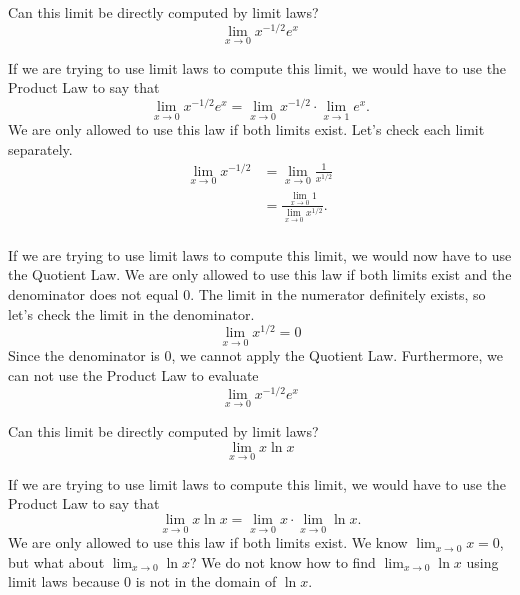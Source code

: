 \documentclass{ximera}
\begin{document}
\begin{question}
  Can this limit be directly computed by limit laws?
  \[
  \lim_{x\to 0}{x^{-1/2}e^x}
  \]
  \begin{prompt}
  \begin{multipleChoice}
  \end{multipleChoice}
  \begin{feedback}
    If we are trying to use limit laws to compute this limit, we would have to use the Product Law to say that
    \[
    \lim_{x\to 0}{x^{-1/2}e^x}= \lim_{x\to 0}{x^{-1/2}\cdot \lim_{x\to 1}e^x}.
    \]
    We are only allowed to use this law if both limits exist.  Let's
    check each limit separately.
    \begin{align*}
      \lim_{x\to 0} x^{-1/2} &= \lim_{x\to 0} \frac{1}{x^{1/2}}\\
      &= \frac{\lim_{x\to 0}1}{\lim_{x\to 0}x^{1/2}}.\\
    \end{align*}

   If we are trying to use limit laws to compute this limit, we would now have to use the Quotient Law. We are only allowed to use this law if both limits exist and the denominator does not equal $0$.  The limit in the numerator definitely exists, so let's check the limit in the denominator.
   $$
   \lim_{x\to 0}x^{1/2} = 0
   $$
  Since the denominator is $0$, we cannot apply the Quotient Law. Furthermore, we can not use the Product Law to evaluate
  $$
  \lim_{x\to 0}x^{-1/2}e^x
  $$
  \end{feedback}
  \end{prompt}
\end{question}

\begin{question}
  Can this limit be directly computed by limit laws?
  \[
  \lim_{x\to 0} x\ln x
  \]
  \begin{prompt}
  \begin{multipleChoice}
  \end{multipleChoice}
  \begin{feedback}
  If we are trying to use limit laws to compute this limit, we would
  have to use the Product Law to say that
  \[
  \lim_{x\to 0} x\ln x =\lim_{x\to 0} x \cdot \lim_{x\to 0}\ln x.
  \]
  We are only allowed to use this law if both limits exist.  We know
  $\lim_{x\to 0} x = 0$, but what about $\lim_{x\to 0}\ln x$?  We do
  not know how to find $\lim_{x\to 0}\ln x$ using limit laws because $0$
  is not in the domain of $\ln x$.
  \end{feedback}
  \end{prompt}
\end{question}
\end{document}
